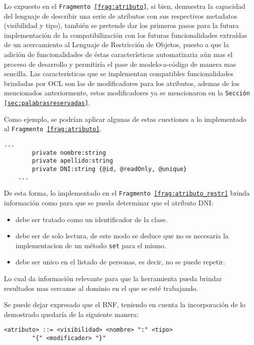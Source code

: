 Lo expuesto en el \texttt{Fragmento \ref{frag:atributo}}, si bien, demuestra
la capacidad del lenguaje de describir una serie de atributos con sus
respectivos metadatos (visibilidad y tipo), también se pretende dar los
primeros pasos para la futura implementación de la compatibilización con los
futuras funcionalidades extraídas de un acercamiento al Lenguaje de
Restricción de Objetos, puesto a que la adición de funcionalidades de éstas
características automatizaria aún mas el proceso de
desarrollo y permitiría el pase de modelo-a-código de manera mas sencilla.
Las características que se implementan compatibles funcionalidades brindadas
por OCL son las de modificadores para los atributos, ademas de los mencionados
anteriormente, estos modificadores ya se mencionaron en la \texttt{Sección
\ref{sec:palabrasreservadas}}.

Como ejemplo, se podrían aplicar algunas de estas cuestiones a lo implementado
al \texttt{Fragmento \ref{frag:atributo}}.

\begin{lstlisting}[label=frag:atributo_restr]
  ...
		private nombre:string
		private apellido:string
		private DNI:string {@id, @readOnly, @unique}
	...
\end{lstlisting}

De esta forma, lo implementado en el \texttt{Fragmento
\ref{frag:atributo_restr}} brinda información como para que se pueda determinar
que el atributo DNI:
\begin{itemize}
	\item debe ser tratado como un identificador de la clase.
	\item debe ser de solo lectura, de este modo se deduce que no es necesaria la
		implementacion de un método \texttt{set} para el mismo.
	\item debe ser unico en el listado de personas, es decir, no se puede
		repetir.
\end{itemize}

Lo cual da información relevante para que la herramienta pueda brindar
resultados mas cercanos al dominio en el que se esté trabajando.

Se puede dejar expresado que el BNF, teniendo en cuenta la incorporación de lo
demostrado quedaría de la siguiente manera:

\begin{lstlisting}[basicstyle=\ttfamily\footnotesize, label=frag:bnf_atributo_restr]
		<atributo> ::= <visibilidad> <nombre> ":" <tipo>
		"{" <modificador> "}"
\end{lstlisting}

